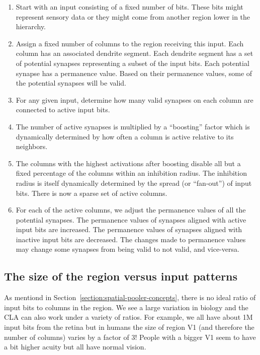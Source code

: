 \documentclass{report}
\begin{document}
\begin{enumerate}
\item Start with an input consisting of a fixed number of bits. These
  bits might represent sensory data or they might come from another
  region lower in the hierarchy.

\item Assign a fixed number of columns to the region receiving this
  input. Each column has an associated dendrite segment. Each dendrite
  segment has a set of potential synapses representing a subset of the
  input bits. Each potential synapse has a permanence value. Based on
  their permanence values, some of the potential synapses will be
  valid.

\item For any given input, determine how many valid synapses on each
  column are connected to active input bits.

\item The number of active synapses is multiplied by a ``boosting''
  factor which is dynamically determined by how often a column is
  active relative to its neighbors.

\item The columns with the highest activations after boosting disable
  all but a fixed percentage of the columns within an inhibition
  radius. The inhibition radius is itself dynamically determined by
  the spread (or ``fan-out'') of input bits. There is now a sparse set
  of active columns.

\item For each of the active columns, we adjust the permanence values
  of all the potential synapses. The permanence values of synapses
  aligned with active input bits are increased. The permanence values
  of synapses aligned with inactive input bits are decreased. The
  changes made to permanence values may change some synapses from
  being valid to not valid, and vice-versa.
\end{enumerate}

\subsection*{The size of the region versus input patterns}
As mentiond in Section~\ref{section:spatial-pooler-concepts}, there is no
ideal ratio of input bits to columns in the region.  We see a large variation
in biology and the CLA can also work under a variety of ratios.
For example, we all have about 1M input bits from the retina but in humans
the size of region V1 (and therefore the number of columns) varies by a factor
of 3! People with a bigger V1 seem to have a bit higher acuity but
all have normal vision.
\end{document}
